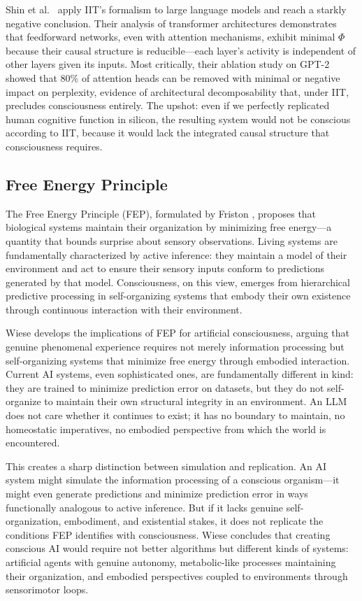 Shin et al.\ \cite{shin2025iit} apply IIT's formalism to large language models and reach
a starkly negative conclusion. Their analysis of transformer architectures demonstrates
that feedforward networks, even with attention mechanisms, exhibit minimal $\Phi$ because
their causal structure is reducible---each layer's activity is independent of other layers
given its inputs. Most critically, their ablation study on GPT-2 showed that 80\% of
attention heads can be removed with minimal or negative impact on perplexity, evidence of
architectural decomposability that, under IIT, precludes consciousness entirely. The
upshot: even if we perfectly replicated human cognitive function in silicon, the resulting
system would not be conscious according to IIT, because it would lack the integrated
causal structure that consciousness requires.

\subsection{Free Energy Principle}

The Free Energy Principle (FEP), formulated by Friston \cite{friston2010free}, proposes
that biological systems maintain their organization by minimizing free energy---a quantity
that bounds surprise about sensory observations. Living systems are fundamentally
characterized by active inference: they maintain a model of their environment and act to
ensure their sensory inputs conform to predictions generated by that model. Consciousness,
on this view, emerges from hierarchical predictive processing in self-organizing systems
that embody their own existence through continuous interaction with their environment.

Wiese \cite{wiese2024fep} develops the implications of FEP for artificial consciousness,
arguing that genuine phenomenal experience requires not merely information processing but
self-organizing systems that minimize free energy through embodied interaction. Current AI
systems, even sophisticated ones, are fundamentally different in kind: they are trained to
minimize prediction error on datasets, but they do not self-organize to maintain their own
structural integrity in an environment. An LLM does not care whether it continues to exist;
it has no boundary to maintain, no homeostatic imperatives, no embodied perspective from
which the world is encountered.

This creates a sharp distinction between simulation and replication. An AI system might
simulate the information processing of a conscious organism---it might even generate
predictions and minimize prediction error in ways functionally analogous to active
inference. But if it lacks genuine self-organization, embodiment, and existential stakes,
it does not replicate the conditions FEP identifies with consciousness. Wiese concludes
that creating conscious AI would require not better algorithms but different kinds of
systems: artificial agents with genuine autonomy, metabolic-like processes maintaining
their organization, and embodied perspectives coupled to environments through sensorimotor
loops.

